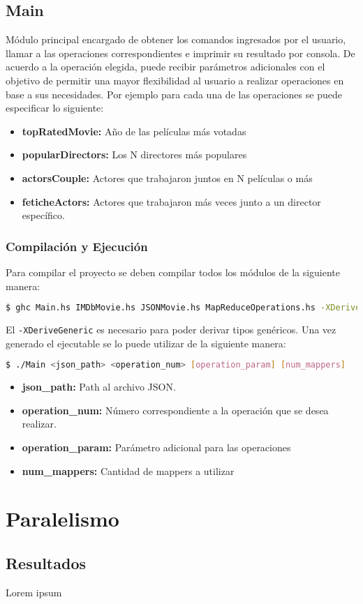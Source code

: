 \documentclass[a4paper,11pt]{article}
\begin{document}
\subsection{Main}

Módulo principal encargado de obtener los comandos ingresados por el usuario, llamar a las operaciones correspondientes e imprimir su resultado por consola. De acuerdo a la operación elegida, puede recibir parámetros adicionales con el objetivo de permitir una mayor flexibilidad al usuario a realizar operaciones en base a sus necesidades. Por ejemplo para cada una de las operaciones se puede especificar lo siguiente:

\begin{itemize}
	\item \textbf{topRatedMovie:} Año de las películas más votadas
	\item \textbf{popularDirectors:} Los N directores más populares
	\item \textbf{actorsCouple:} Actores que trabajaron juntos en N películas o más
	\item \textbf{feticheActors:} Actores que trabajaron más veces junto a un director específico.
\end{itemize}

\subsubsection{Compilación y Ejecución}
Para compilar el proyecto se deben compilar todos los módulos de la siguiente manera:
	\begin{lstlisting}[language=bash]
  $ ghc Main.hs IMDbMovie.hs JSONMovie.hs MapReduceOperations.hs -XDeriveGeneric
	\end{lstlisting}
  
El \texttt{-XDeriveGeneric} es necesario para poder derivar tipos genéricos. Una vez generado el ejecutable se lo puede utilizar de la siguiente manera:


  	\begin{lstlisting}[language=bash]
  $ ./Main <json_path> <operation_num> [operation_param] [num_mappers]
    \end{lstlisting}
    
\begin{itemize}
	\item \textbf{json\_path:} Path al archivo JSON.
	\item \textbf{operation\_num:} Número correspondiente a la operación que se desea realizar.
	\item \textbf{operation\_param:} Parámetro adicional para las operaciones
	\item \textbf{num\_mappers:} Cantidad de mappers a utilizar
\end{itemize}
  

\section{Paralelismo}



\subsection{Resultados}

Lorem ipsum
\end{document}
